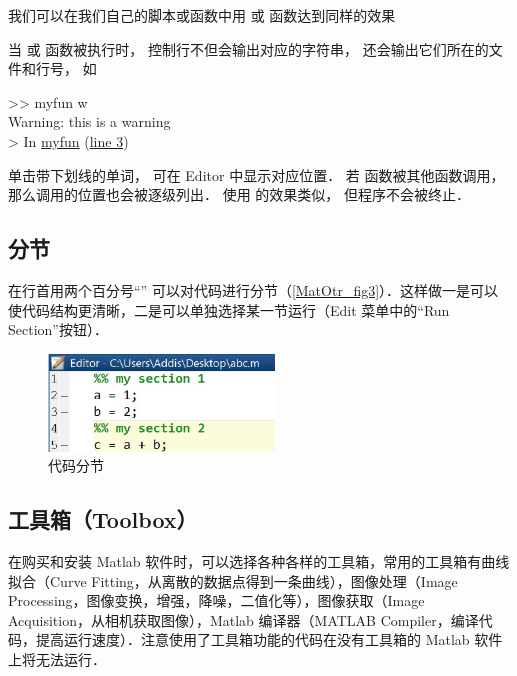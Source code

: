 我们可以在我们自己的脚本或函数中用  或  函数达到同样的效果


当  或  函数被执行时， 控制行不但会输出对应的字符串， 还会输出它们所在的文件和行号， 如
\begin{Command}
>> myfun w\\
{\color{warning}Warning: this is a warning\\
> In \underline{myfun} (\underline{line 3})}
\end{Command}
单击带下划线的单词， 可在 Editor 中显示对应位置． 若  函数被其他函数调用， 那么调用的位置也会被逐级列出． 使用  的效果类似， 但程序不会被终止．

\subsection{分节}
在行首用两个百分号“\x{\%\%}” 可以对代码进行分节（\autoref{MatOtr_fig3}）．这样做一是可以使代码结构更清晰，二是可以单独选择某一节运行（Edit 菜单中的“Run Section”按钮）．
\begin{figure}[ht]
\centering
\includegraphics[width= 6cm]{./figures/MatOtr3.pdf}
\caption{代码分节}\label{MatOtr_fig3}
\end{figure}

\subsection{工具箱（Toolbox）}
在购买和安装 Matlab 软件时，可以选择各种各样的工具箱，常用的工具箱有曲线拟合（Curve Fitting，从离散的数据点得到一条曲线），图像处理（Image Processing，图像变换，增强，降噪，二值化等），图像获取（Image Acquisition，从相机获取图像），Matlab 编译器（MATLAB Compiler，编译代码，提高运行速度）．注意使用了工具箱功能的代码在没有工具箱的 Matlab 软件上将无法运行．




